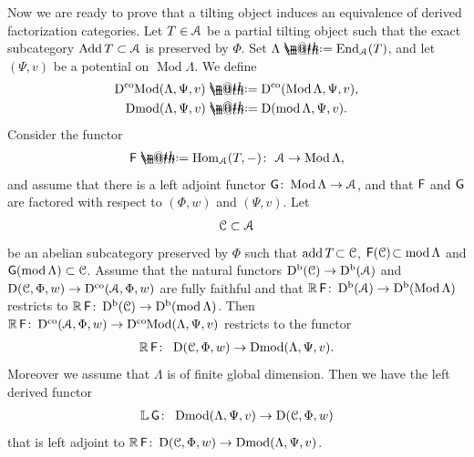 \documentclass[pdftex]{sigma}%
\makeatletter
\newcommand*{\defeq}{\mathrel{\rlap{%
 \raisebox{0.3ex}{$\m@th\cdot$}}%
 \raisebox{-0.3ex}{$\m@th\cdot$}}%
 =}
\numberwithin{equation}{section}
\newcommand{\Dmod}{\operatorname{Dmod}}
\newcommand{\DcoMod}{\operatorname{D^{co}\hspace{-0.1mm}Mod}}
\newcommand{\Hom}{\operatorname{Hom}}
\newcommand{\End}{\operatorname{End}}
\newcommand{\Mod}{\operatorname{Mod}}
\newcommand{\fmod}{\operatorname{mod}}
\newcommand{\add}{\operatorname{add}}
\newcommand{\Add}{\operatorname{Add}}
\newcommand{\Db}{\operatorname{D^b}}
\newcommand{\Dco}{\operatorname{D^{co}}}
\newcommand{\D}{\operatorname{D}}
\newcommand{\bL}{\mathbb{L}}
\newcommand{\bR}{\mathbb{R}}
\newcommand{\scrA}{\EuScript{A}}
\newcommand{\scrC}{\EuScript{C}}
\newcommand{\F}{\operatorname{\sf{F}}}
\newcommand{\G}{\operatorname{\sf{G}}}
\makeatother
\begin{document}
Now we are ready to prove that a tilting object induces an equivalence of derived factorization categories. Let $T\in \scrA$ be a partial tilting object such that the exact subcategory $\Add T\subset \scrA$ is preserved by $\Phi$. Set $\Lambda\defeq\End_{\scrA}(T)$, and
 let $(\Psi,v)$ be a potential on $\Mod\Lambda$. We define
 \begin{gather*}
 \DcoMod(\Lambda,\Psi,v)\defeq\Dco(\Mod\Lambda,\Psi,v),
 \\
 \Dmod(\Lambda,\Psi,v)\defeq\D(\fmod\Lambda,\Psi,v).
 \end{gather*}
Consider the functor
 \begin{gather*}
 \F\defeq\Hom_{\scrA}(T,-)\colon\ \scrA\to \Mod\Lambda,
 \end{gather*}
 and assume that there is a left adjoint functor $\G\colon \Mod\Lambda\to \scrA$, and that $\F$ and $\G$ are factored with respect to $(\Phi,w)$ and $(\Psi,v)$. Let
 \begin{gather*}
 \scrC\subset \scrA
 \end{gather*}
 be an abelian subcategory preserved by $\Phi$ such that $\add T\!\subset \scrC$, $\F(\scrC)\!\subset \fmod\Lambda$ and \mbox{$\G(\fmod\Lambda)\subset \scrC$}. Assume that the natural functors $\Db(\scrC)\to\Db(\scrA)$ and $\D(\scrC,\Phi,w)\to \Dco(\scrA,\Phi,w)$ are fully faithful and that $\bR \F\colon\Db(\scrA)\to\Db(\Mod\Lambda)$ restricts to $\bR \F\colon\Db(\scrC)\to\Db(\fmod\Lambda)$. Then $\bR \F\colon\Dco(\scrA,\Phi,w)\to \DcoMod(\Lambda,\Psi,v)$ restricts to the functor
\begin{gather*}
\bR \F\colon\ \D(\scrC,\Phi,w)\to \Dmod(\Lambda,\Psi,v).
\end{gather*}
Moreover we assume that $\Lambda$ is of finite global dimension. Then we have the left derived functor
\begin{gather*}
\bL\G\colon\ \Dmod(\Lambda,\Psi,v)\to \D(\scrC,\Phi,w)
\end{gather*}
that is left adjoint to $\bR\F\colon\D(\scrC,\Phi,w)\to \Dmod(\Lambda,\Psi,v)$.
\end{document}
